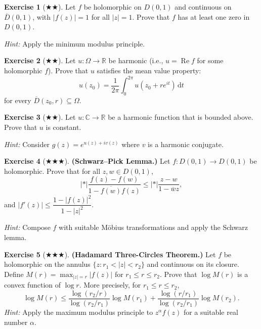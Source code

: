 \documentclass[12pt,a4paper,openany]{book}
\theoremstyle{definition}
\newtheorem{exercise}{Exercise}[chapter]
\theoremstyle{plain}
\theoremstyle{remark}
\newcommand{\C}{\mathbb{C}}
\newcommand{\R}{\mathbb{R}}
\DeclareMathOperator{\re}{Re}
\newcommand{\dd}{\mathrm{d}}
\newcommand{\abs}[1]{\left|#1\right|}
\newcommand{\conj}[1]{\overline{#1}}
\begin{document}
\begin{exercise}[$\bigstar\!\bigstar$]\label{exo:max-modulus-application}
Let $f$ be holomorphic on $D(0,1)$ and continuous on $\overline{D}(0,1)$, with
$\abs{f(z)}=1$ for all $\abs{z}=1$. Prove that $f$ has at least one zero in
$D(0,1)$.

\textit{Hint:} Apply the minimum modulus principle.
\end{exercise}

\begin{exercise}[$\bigstar\!\bigstar$]\label{exo:mean-value-harmonic}
Let $u\colon\Omega\to\R$ be harmonic (i.e., $u=\re f$ for some holomorphic $f$).
Prove that $u$ satisfies the mean value property:
\[
  u(z_0) = \frac{1}{2\pi}\int_0^{2\pi}u(z_0+re^{it})\,\dd t
\]
for every $\overline{D}(z_0,r)\subseteq\Omega$.
\end{exercise}

\begin{exercise}[$\bigstar\!\bigstar$]\label{exo:liouville-harmonic}
Let $u\colon\C\to\R$ be a harmonic function that is bounded above. Prove that $u$
is constant.

\textit{Hint:} Consider $g(z)=e^{u(z)+iv(z)}$ where $v$ is a harmonic conjugate.
\end{exercise}

\begin{exercise}[$\bigstar\!\bigstar\!\bigstar$]\label{exo:schwarz-pick}
\textbf{(Schwarz--Pick Lemma.)}
Let $f\colon D(0,1)\to D(0,1)$ be holomorphic. Prove that for all $z,w\in D(0,1)$,
\[
  \abs*{\frac{f(z)-f(w)}{1-\overline{f(w)}f(z)}}
  \le \abs*{\frac{z-w}{1-\conj{w}z}},
\]
and $\abs{f'(z)}\le\dfrac{1-\abs{f(z)}^2}{1-\abs{z}^2}$.

\textit{Hint:} Compose $f$ with suitable M\"obius transformations and apply the Schwarz lemma.
\end{exercise}

\begin{exercise}[$\bigstar\!\bigstar\!\bigstar$]\label{exo:hadamard-three-circles}
\textbf{(Hadamard Three-Circles Theorem.)}
Let $f$ be holomorphic on the annulus $\{z : r_1 < \abs{z} < r_2\}$ and continuous
on its closure. Define $M(r)=\max_{\abs{z}=r}\abs{f(z)}$ for $r_1\le r\le r_2$.
Prove that $\log M(r)$ is a convex function of $\log r$. More precisely, for
$r_1\le r\le r_2$,
\[
  \log M(r) \le \frac{\log(r_2/r)}{\log(r_2/r_1)}\log M(r_1)
  + \frac{\log(r/r_1)}{\log(r_2/r_1)}\log M(r_2).
\]
\textit{Hint:} Apply the maximum modulus principle to $z^{\alpha}f(z)$ for a suitable
real number $\alpha$.
\end{exercise}
\end{document}
